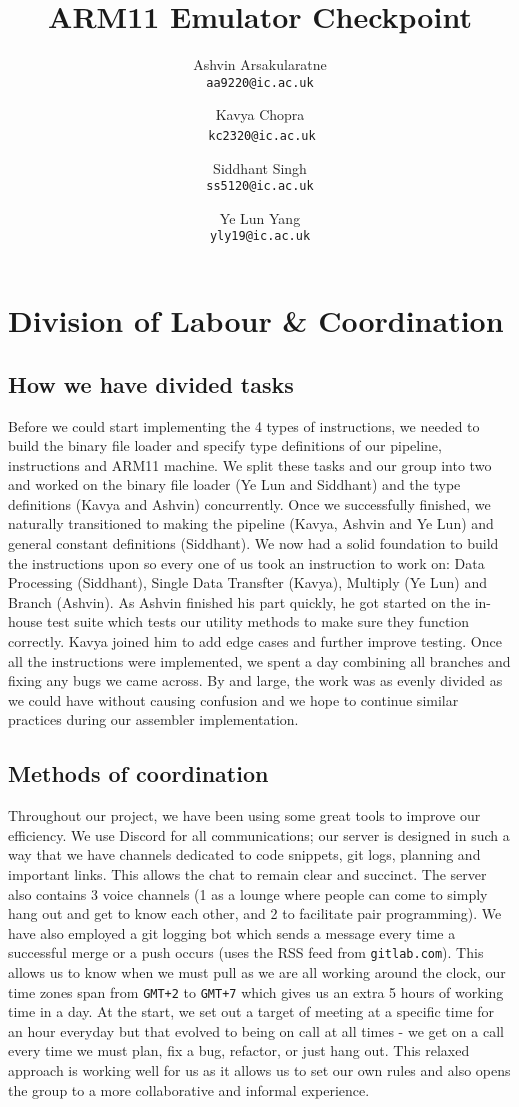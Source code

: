 \documentclass[a4paper]{article}
\title{\textbf{ARM11 Emulator Checkpoint}}
\author{
  Ashvin Arsakularatne\\
  \texttt{aa9220@ic.ac.uk}
  \and
  Kavya Chopra\\
  \texttt{kc2320@ic.ac.uk}
  \and
  Siddhant Singh\\
  \texttt{ss5120@ic.ac.uk}
  \and
  Ye Lun Yang\\
  \texttt{yly19@ic.ac.uk}
}
\begin{document}
\maketitle
\section{Division of Labour \& Coordination}
\subsection{How we have divided tasks}
Before we could start implementing the 4 types of instructions, we needed to build the binary file loader and specify type definitions of our pipeline, instructions and ARM11 machine. We split these tasks and our group into two and worked on the binary file loader (Ye Lun and Siddhant) and the type definitions (Kavya and Ashvin) concurrently. Once we successfully finished, we naturally transitioned to making the pipeline (Kavya, Ashvin and Ye Lun) and general constant definitions (Siddhant). We now had a solid foundation to build the instructions upon so every one of us took an instruction to work on: Data Processing (Siddhant), Single Data Transfter (Kavya), Multiply (Ye Lun) and Branch (Ashvin). As Ashvin finished his part quickly, he got started on the in-house test suite which tests our utility methods to make sure they function correctly. Kavya joined him to add edge cases and further improve testing. Once all the instructions were implemented, we spent a day combining all branches and fixing any bugs we came across. By and large, the work was as evenly divided as we could have without causing confusion and we hope to continue similar practices during our assembler implementation.

\subsection{Methods of coordination}
Throughout our project, we have been using some great tools to improve our efficiency. We use Discord for all communications; our server is designed in such a way that we have channels dedicated to code snippets, git logs, planning and important links. This allows the chat to remain clear and succinct. The server also contains 3 voice channels (1 as a lounge where people can come to simply hang out and get to know each other, and 2 to facilitate pair programming). We have also employed a git logging bot which sends a message every time a successful merge or a push occurs (uses the RSS feed from \texttt{gitlab.com}). This allows us to know when we must pull as we are all working around the clock, our time zones span from \texttt{GMT+2} to \texttt{GMT+7} which gives us an extra 5 hours of working time in a day. At the start, we set out a target of meeting at a specific time for an hour everyday but that evolved to being on call at all times - we get on a call every time we must plan, fix a bug, refactor, or just hang out. This relaxed approach is working well for us as it allows us to set our own rules and also opens the group to a more collaborative and informal experience.
\end{document}
